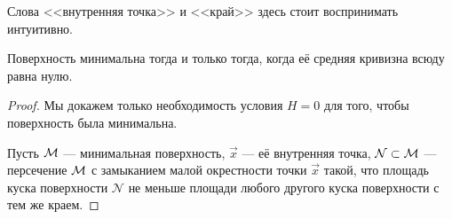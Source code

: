 \noindent
Слова <<внутренняя точка>> и <<край>> здесь стоит воспринимать интуитивно.

\begin{theorem}
	Поверхность минимальна тогда и только тогда, когда её средняя кривизна всюду равна нулю.
\end{theorem}

\begin{proof}
	Мы докажем только необходимость условия $H = 0$ для того, чтобы поверхность была минимальна.

	Пусть $\mathcal{M}$ --- минимальная поверхность, $\vec{x}$ --- её внутренняя точка, $\mathcal{N} \subset \mathcal{M}$ --- персечение $\mathcal{M}$ с замыканием малой окрестности точки $\vec{x}$ такой, что площадь куска поверхности $\mathcal{N}$ не меньше площади любого другого куска поверхности с тем же краем.


\end{proof}
